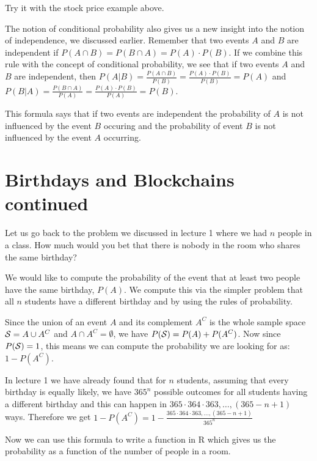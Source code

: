 \documentclass[
]{book}
\begin{document}
Try it with the stock price example above.

The notion of conditional probability also gives us a new insight into the notion of
independence, we discussed earlier. Remember that two events \(A\) and \(B\) are independent
if \(P(A \cap B) = P(B \cap A) = P(A) \cdot P(B)\). If we combine this rule with the
concept of conditional probability, we see that if two events \(A\) and \(B\) are independent, then
\(P(A|B) = \frac{P(A \cap B)}{P(B)} = \frac{P(A) \cdot P(B)}{P(B)} = P(A)\) and
\(P(B|A) = \frac{P(B \cap A)}{P(A)} = \frac{P(A) \cdot P(B)}{P(A)} = P(B)\).

This formula says that if two events are independent the probability of \(A\) is
not influenced by the event \(B\) occuring and the probability of event \(B\) is not
influenced by the event \(A\) occurring.

\hypertarget{birthdays-and-blockchains-continued}{%
\section{Birthdays and Blockchains continued}\label{birthdays-and-blockchains-continued}}

Let us go back to the problem we discussed in lecture 1 where we had \(n\) people in a class. How
much would you bet that there is nobody in the room who shares the same birthday?

We would like to compute the probability of the event that at least two people have the
same birthday, \(P(A)\). We compute this via the simpler problem that all \(n\) students have
a different birthday and by using the rules of probability.

Since the union of an event \(A\) and
its complement \(A^C\) is the whole sample space \({\cal S} = A \cup A^C\) and \(A \cap A^C = \emptyset\), we have
\(P({\cal S}) = P(A) + P(A^C)\). Now since \(P({\cal S}) = 1\), this means we can
compute the probability we are looking for as: \(1 - P(A^C)\).

In lecture 1 we have already found that for \(n\) students, assuming that every birthday is
equally likely, we have \(365^n\) possible outcomes for all students having a different birthday
and this can happen in \(365\cdot 364\cdot 363,\ldots, (365-n+1)\) ways. Therefore we get
\(1 - P(A^C) = 1 - \frac{365\cdot 364\cdot 363,\ldots, (365-n+1)}{365^n}\)

Now we can use this formula to write a function in R which gives us the probability as a
function of the number of people in a room.
\end{document}
